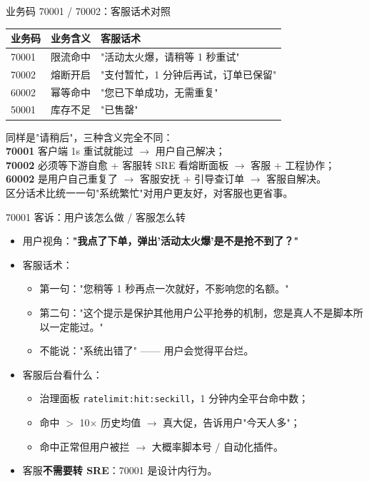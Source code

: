 \documentclass[aspectratio=169,11pt]{beamer}
\begin{document}
\begin{frame}[shrink]{业务码 70001 / 70002：客服话术对照}
\begin{tabular}{@{}lll@{}}
\toprule
业务码 & 业务含义 & 客服话术 \\
\midrule
70001 & 限流命中    & "活动太火爆，请稍等 1 秒重试" \\
70002 & 熔断开启    & "支付暂忙，1 分钟后再试，订单已保留" \\
60002 & 幂等命中    & "您已下单成功，无需重复" \\
50001 & 库存不足    & "已售罄" \\
\bottomrule
\end{tabular}
\vspace{3mm}
\small 同样是"请稍后"，三种含义完全不同：\\
\textbf{70001} 客户端 1s 重试就能过 $\to$ 用户自己解决；\\
\textbf{70002} 必须等下游自愈 + 客服转 SRE 看熔断面板 $\to$ 客服 + 工程协作；\\
\textbf{60002} 是用户自己重复了 $\to$ 客服安抚 + 引导查订单 $\to$ 客服自解决。\\
区分话术比统一一句"系统繁忙"对用户更友好，对客服也更省事。
\end{frame}

\begin{frame}[shrink]{70001 客诉：用户该怎么做 / 客服怎么转}
\begin{itemize}
  \item 用户视角：\textbf{"我点了下单，弹出'活动太火爆'是不是抢不到了？"}
  \item 客服话术：
  \begin{itemize}
    \item 第一句："您稍等 1 秒再点一次就好，不影响您的名额。"
    \item 第二句："这个提示是保护其他用户公平抢券的机制，您是真人不是脚本所以一定能过。"
    \item 不能说："系统出错了" —— 用户会觉得平台烂。
  \end{itemize}
  \item 客服后台看什么：
  \begin{itemize}
    \item 治理面板 \texttt{ratelimit:hit:seckill}，1 分钟内全平台命中数；
    \item 命中 $>$ 10$\times$ 历史均值 $\to$ 真大促，告诉用户"今天人多"；
    \item 命中正常但用户被拦 $\to$ 大概率脚本号 / 自动化插件。
  \end{itemize}
  \item 客服\textbf{不需要转 SRE}：70001 是设计内行为。
\end{itemize}
\end{frame}
\end{document}
